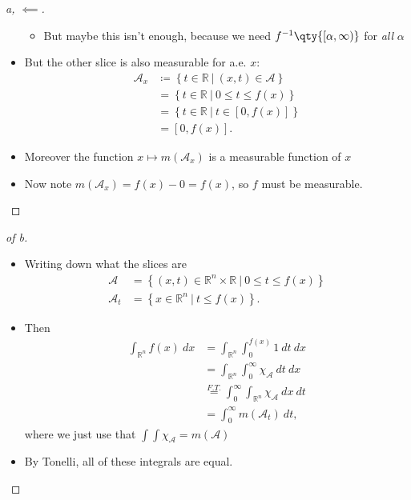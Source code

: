\begin{solution}
\begin{proof}[a, $\impliedby$]
\begin{itemize}
  \begin{itemize}
  \tightlist
  \item
    But maybe this isn't enough, because we need
    \(f^{-1}\qty{[\alpha, \infty)}\) for \emph{all} \(\alpha\)
  \end{itemize}
\item
  But the other slice is also measurable for a.e. \(x\):
  \begin{align*}
  {\mathcal{A}}_x 
  &\coloneqq\left\{{ t\in {\mathbb{R}}{~\mathrel{\Big|}~}(x, t) \in {\mathcal{A}}}\right\} \\
  &= \left\{{ t\in {\mathbb{R}}{~\mathrel{\Big|}~}0 \leq t \leq f(x) }\right\} \\
  &= \left\{{ t\in {\mathbb{R}}{~\mathrel{\Big|}~}t\in [0, f(x)]  }\right\} \\
  &= [0, f(x)]
  .\end{align*}
\item
  Moreover the function \(x\mapsto m({\mathcal{A}}_x)\) is a measurable
  function of \(x\)
\item
  Now note \(m({\mathcal{A}}_x) = f(x) - 0 = f(x)\), so \(f\) must be
  measurable.
\end{itemize}

\end{proof}

\begin{proof}[of b]

\envlist

\begin{itemize}
\item
  Writing down what the slices are
  \begin{align*}
  \mathcal{A} &= \left\{{(x, t) \in {\mathbb{R}}^n\times{\mathbb{R}}{~\mathrel{\Big|}~}0 \leq t \leq f(x)}\right\} 
  \\
  \mathcal{A}_t &= \left\{{x
  \in {\mathbb{R}}^n {~\mathrel{\Big|}~}t\leq f(x) }\right\}
  .\end{align*}
\item
  Then
  \begin{align*}
  \int_{{\mathbb{R}}^n} f(x) ~dx 
  &= \int_{{\mathbb{R}}^n} \int_0^{f(x)} 1 ~dt~dx \\
  &= \int_{{\mathbb{R}}^n} \int_{0}^\infty \chi_\mathcal{A} ~dt~dx \\
  &\overset{F.T.}= \int_{0}^\infty \int_{{\mathbb{R}}^n} \chi_\mathcal{A} ~dx~dt\\
  &= \int_0^\infty m(\mathcal{A}_t) ~dt
  ,\end{align*}
  where we just use that \(\int \int \chi_\mathcal{A} = m(\mathcal{A})\)
\item
  By Tonelli, all of these integrals are equal.


\end{itemize}
\end{proof}
\end{solution}
